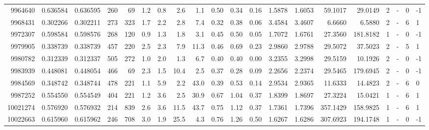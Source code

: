 \begin{tabular}{rrrrrrrrrrrrrrrrrlrl}
   9964640 & 0.636584 &   0.636595 &  260 &   69 &      1.2 &      0.8 &     2.6 &      1.1 &       0.50 &        0.34 &        0.16 &  1.5878 &  1.6053 &   59.1017 &   29.0149 &       2 &             - &        0 &        -1 \\
   9968431 & 0.302266 &   0.302211 &  273 &  323 &      1.7 &      2.2 &     2.8 &      7.4 &       0.32 &        0.38 &        0.06 &  3.4584 &  3.4607 &    6.6660 &    6.5880 &       2 &             - &        6 &         1 \\
   9972307 & 0.598584 &   0.598576 &  268 &  120 &      0.9 &      1.3 &     1.8 &      3.1 &       0.45 &        0.50 &        0.05 &  1.7072 &  1.6761 &   27.3560 &  181.8182 &       1 &             - &        0 &        -1 \\
   9979905 & 0.338739 &   0.338739 &  457 &  220 &      2.5 &      2.3 &     7.9 &     11.3 &       0.46 &        0.69 &        0.23 &  2.9860 &  2.9788 &   29.5072 &   37.5023 &       2 &             - &        5 &         1 \\
   9980782 & 0.312339 &   0.312337 &  505 &  272 &      1.0 &      2.0 &     1.3 &      6.7 &       0.40 &        0.40 &        0.00 &  3.2355 &  3.2998 &   29.5159 &   10.1926 &       2 &             - &        0 &        -1 \\
   9983939 & 0.448081 &   0.448054 &  466 &   69 &      2.3 &      1.5 &    10.4 &      2.5 &       0.37 &        0.28 &        0.09 &  2.2656 &  2.2374 &   29.5465 &  179.6945 &       2 &             - &        0 &        -1 \\
   9984569 & 0.348742 &   0.348744 &  478 &  221 &      1.1 &      5.9 &     2.2 &     43.0 &       0.39 &        0.53 &        0.14 &  2.9534 &  2.9365 &   11.6333 &   14.4823 &       2 &             - &        6 &         0 \\
   9987252 & 0.554550 &   0.554549 &  404 &  221 &      1.2 &      3.6 &     2.5 &     30.9 &       0.67 &        1.04 &        0.37 &  1.8399 &  1.8697 &   27.3224 &   15.0421 &       1 &             - &        6 &         1 \\
  10021274 & 0.576920 &   0.576932 &  214 &  839 &      2.6 &      3.6 &    11.5 &     43.7 &       0.75 &        1.12 &        0.37 &  1.7361 &  1.7396 &  357.1429 &  158.9825 &       1 &             - &        6 &         1 \\
  10022663 & 0.615960 &   0.615962 &  246 &  708 &      3.0 &      1.9 &    25.5 &      4.3 &       0.76 &        1.26 &        0.50 &  1.6267 &  1.6286 &  307.6923 &  194.1748 &       1 &             - &        0 &        -1 \\

\end{tabular}
